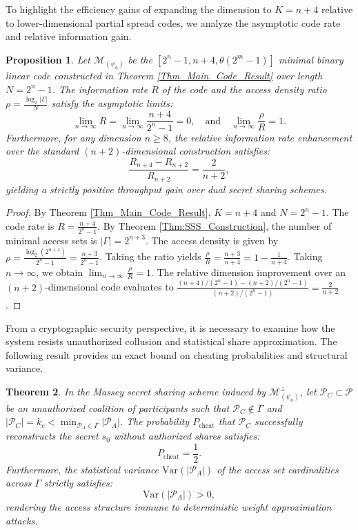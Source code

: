 \documentclass[pdflatex,sn-mathphys-num]{sn-jnl}%
\theoremstyle{thmstyleone}%
\newtheorem{theorem}{Theorem}%
\newtheorem{proposition}[theorem]{Proposition}%
\theoremstyle{thmstyletwo}%
\theoremstyle{thmstylethree}%
\begin{document}
To highlight the efficiency gains of expanding the dimension to $K = n+4$ relative to lower-dimensional partial spread codes, we analyze the asymptotic code rate and relative information gain.

\begin{proposition}\label{prop:information_rate}
Let $\mathcal{M}_{(\psi_a)}$ be the $[2^n-1, n+4, \theta(2^m-1)]$ minimal binary linear code constructed in Theorem \ref{Thm_Main_Code_Result} over length $N = 2^n - 1$. The information rate $R$ of the code and the access density ratio $\rho = \frac{\log_2 |\Gamma|}{N}$ satisfy the asymptotic limits:
\[
\lim_{n \to \infty} R = \lim_{n \to \infty} \frac{n+4}{2^n - 1} = 0, \quad \text{and} \quad \lim_{n \to \infty} \frac{\rho}{R} = 1.
\]
Furthermore, for any dimension $n \ge 8$, the relative information rate enhancement over the standard $(n+2)$-dimensional construction \cite{LiuLiao2022} satisfies:
\[
\frac{R_{n+4} - R_{n+2}}{R_{n+2}} = \frac{2}{n+2},
\]
yielding a strictly positive throughput gain over dual secret sharing schemes.
\end{proposition}

\begin{proof}
By Theorem \ref{Thm_Main_Code_Result}, $K = n+4$ and $N = 2^n - 1$. The code rate is $R = \frac{n+4}{2^n - 1}$. By Theorem \ref{Thm:SSS_Construction}, the number of minimal access sets is $|\Gamma| = 2^{n+3}$. The access density is given by $\rho = \frac{\log_2(2^{n+3})}{2^n - 1} = \frac{n+3}{2^n - 1}$. Taking the ratio yields $\frac{\rho}{R} = \frac{n+3}{n+4} = 1 - \frac{1}{n+4}$. Taking $n \to \infty$, we obtain $\lim_{n \to \infty} \frac{\rho}{R} = 1$. The relative dimension improvement over an $(n+2)$-dimensional code evaluates to $\frac{(n+4)/(2^n-1) - (n+2)/(2^n-1)}{(n+2)/(2^n-1)} = \frac{2}{n+2}$.
\end{proof}

From a cryptographic security perspective, it is necessary to examine how the system resists unauthorized collusion and statistical share approximation. The following result provides an exact bound on cheating probabilities and structural variance.

\begin{theorem}\label{thm:cheating_prob}
In the Massey secret sharing scheme induced by $\mathcal{M}_{(\psi_a)}^\perp$, let $\mathcal{P}_C \subset \mathcal{P}$ be an unauthorized coalition of participants such that $\mathcal{P}_C \notin \Gamma$ and $|\mathcal{P}_C| = k_c < \min_{\mathcal{P}_A \in \Gamma} |\mathcal{P}_A|$. The probability $P_{\mathrm{cheat}}$ that $\mathcal{P}_C$ successfully reconstructs the secret $s_0$ without authorized shares satisfies:
\[
P_{\mathrm{cheat}} = \frac{1}{2}.
\]
Furthermore, the statistical variance $\mathrm{Var}(|\mathcal{P}_A|)$ of the access set cardinalities across $\Gamma$ strictly satisfies:
\[
\mathrm{Var}(|\mathcal{P}_A|) > 0,
\]
rendering the access structure immune to deterministic weight approximation attacks.
\end{theorem}
\end{document}
